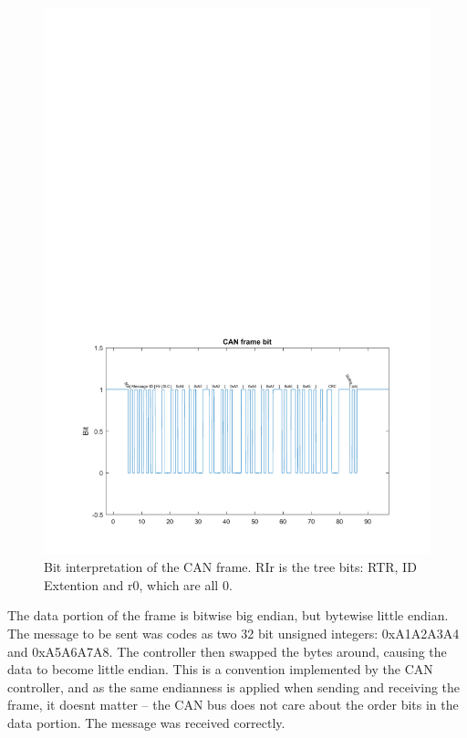\begin{figure}[h]
	\centering
	\includegraphics[width = \linewidth]{graphics/CAN_test1_message}
	\caption{Bit interpretation of the CAN frame. RIr  is the tree bits: RTR, ID Extention and r0, which are all 0.}
	\label{fig:CAN_test1_message}
\end{figure}

The data portion of the frame is bitwise big endian, but bytewise little endian. 
The message to be sent was codes as two 32 bit unsigned integers: 0xA1A2A3A4 and 0xA5A6A7A8.
The controller then swapped the bytes around, causing the data to become little endian.
This is a convention implemented by the CAN controller, and as the same endianness is applied when sending and receiving the frame, it doesnt matter -- the CAN bus does not care about the order bits in the data portion. 
The message was received correctly.\\

